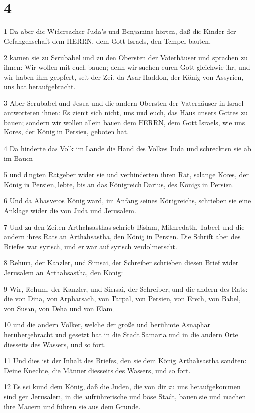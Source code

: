 \chapter{4}

\par 1 Da aber die Widersacher Juda's und Benjamins hörten, daß die Kinder der Gefangenschaft dem HERRN, dem Gott Israels, den Tempel bauten,
\par 2 kamen sie zu Serubabel und zu den Obersten der Vaterhäuser und sprachen zu ihnen: Wir wollen mit euch bauen; denn wir suchen euren Gott gleichwie ihr, und wir haben ihm geopfert, seit der Zeit da Asar-Haddon, der König von Assyrien, uns hat heraufgebracht.
\par 3 Aber Serubabel und Jesua und die andern Obersten der Vaterhäuser in Israel antworteten ihnen: Es ziemt sich nicht, uns und euch, das Haus unsers Gottes zu bauen; sondern wir wollen allein bauen dem HERRN, dem Gott Israels, wie uns Kores, der König in Persien, geboten hat.
\par 4 Da hinderte das Volk im Lande die Hand des Volkes Juda und schreckten sie ab im Bauen
\par 5 und dingten Ratgeber wider sie und verhinderten ihren Rat, solange Kores, der König in Persien, lebte, bis an das Königreich Darius, des Königs in Persien.
\par 6 Und da Ahasveros König ward, im Anfang seines Königreichs, schrieben sie eine Anklage wider die von Juda und Jerusalem.
\par 7 Und zu den Zeiten Arthahsasthas schrieb Bislam, Mithredath, Tabeel und die andern ihres Rats an Arthahsastha, den König in Persien. Die Schrift aber des Briefes war syrisch, und er war auf syrisch verdolmetscht.
\par 8 Rehum, der Kanzler, und Simsai, der Schreiber schrieben diesen Brief wider Jerusalem an Arthahsastha, den König:
\par 9 Wir, Rehum, der Kanzler, und Simsai, der Schreiber, und die andern des Rats: die von Dina, von Arpharsach, von Tarpal, von Persien, von Erech, von Babel, von Susan, von Deha und von Elam,
\par 10 und die andern Völker, welche der große und berühmte Asnaphar herübergebracht und gesetzt hat in die Stadt Samaria und in die andern Orte diesseits des Wassers, und so fort.
\par 11 Und dies ist der Inhalt des Briefes, den sie dem König Arthahsastha sandten: Deine Knechte, die Männer diesseits des Wassers, und so fort.
\par 12 Es sei kund dem König, daß die Juden, die von dir zu uns heraufgekommen sind gen Jerusalem, in die aufrührerische und böse Stadt, bauen sie und machen ihre Mauern und führen sie aus dem Grunde.
